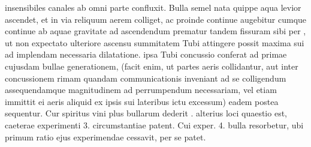 insensibiles canales  ab omni parte confluxit. Bulla semel nata quippe  aqua levior ascendet, et in via reliquum aerem colliget,   ac proinde continue augebitur cumque continue ab aquae gravitate\protect{} ad ascendendum  prematur tandem  fissuram sibi  per , ut non expectato  ulteriore ascensu summitatem Tubi attingere possit  maxima sui ad  implendam necessaria  dilatatione.  ipsa Tubi  concussio conferat ad primae cujusdam bullae generationem,  (facit enim, ut partes aeris  collidantur, aut inter concussionem rimam  quandam communicationis inveniant ad se colligendum  assequendamque magnitudinem ad perrumpendum necessariam, vel  etiam immittit ei aeris aliquid ex ipsis sui lateribus ictu\protect{} excessum)  eadem postea sequentur. Cur spiritus vini\protect{} plus bullarum dederit . alterius loci quaestio est, caeterae experimenti 3. circumstantiae patent. Cui exper. 4. bulla resorbetur, ubi  primum ratio ejus experimendae cessavit, per se patet. 